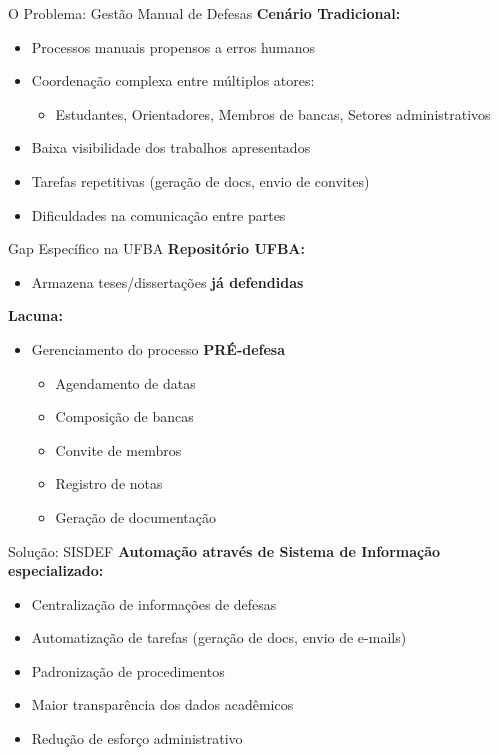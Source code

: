 \documentclass[aspectratio=169,xcolor=table]{beamer}
\begin{document}
\begin{frame}{O Problema: Gestão Manual de Defesas}
    \textbf{Cenário Tradicional:}
    \begin{itemize}
        \item Processos manuais propensos a erros humanos
        \item Coordenação complexa entre múltiplos atores:
        \begin{itemize}
            \item Estudantes, Orientadores, Membros de bancas, Setores administrativos
        \end{itemize}
        \item Baixa visibilidade dos trabalhos apresentados
        \item Tarefas repetitivas (geração de docs, envio de convites)
        \item Dificuldades na comunicação entre partes
    \end{itemize}
\end{frame}

\begin{frame}{Gap Específico na UFBA}
    \textbf{Repositório UFBA:}
    \begin{itemize}
        \item Armazena teses/dissertações \textbf{já defendidas}
    \end{itemize}
    
    \vspace{0.5em}
    \textbf{Lacuna:}
    \begin{itemize}
        \item Gerenciamento do processo \textbf{PRÉ-defesa}
        \begin{itemize}
            \item Agendamento de datas
            \item Composição de bancas
            \item Convite de membros
            \item Registro de notas
            \item Geração de documentação
        \end{itemize}
    \end{itemize}
\end{frame}

\begin{frame}{Solução: SISDEF}
    \textbf{Automação através de Sistema de Informação especializado:}
    \begin{itemize}
        \item Centralização de informações de defesas
        \item Automatização de tarefas (geração de docs, envio de e-mails)
        \item Padronização de procedimentos
        \item Maior transparência dos dados acadêmicos
        \item Redução de esforço administrativo
    \end{itemize}
\end{frame}
\end{document}
